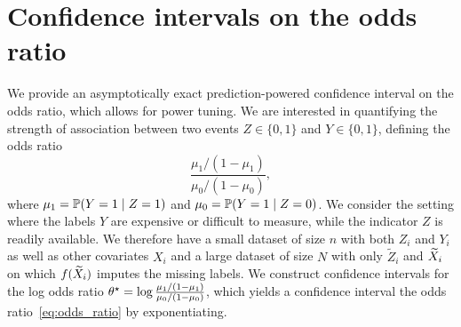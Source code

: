 \section{Confidence intervals on the odds ratio}
\label{app:odds-ratio}

\newcommand{\tZ}{\widetilde{Z}}
\newcommand{\diag}{\textup{diag}}

We provide an asymptotically exact prediction-powered confidence interval on
the odds ratio, which allows for power tuning. We are interested in
quantifying the strength of association between two events $Z\in\{0,1\}$ and
$Y\in\{0,1\}$, defining the odds ratio
\begin{equation}
  \label{eq:odds_ratio}
  \frac{\mu_1/(1-\mu_1)}{\mu_0/(1-\mu_0)},
\end{equation}
where $\mu_1 = \P(Y = 1 \mid Z=1)$ and $\mu_0 = \P(Y = 1 \mid Z=0)$.  We
consider the setting where the labels $Y$ are expensive or difficult to
measure, while the indicator $Z$ is readily available. We therefore have a
small dataset of size $n$ with both $Z_i$ and $Y_i$ as well as other
covariates $X_i$ and a large dataset of size $N$ with only $\tZ_i$ and
$\tX_i$ on which $f(\tX_i)$ imputes the missing labels.
%
We construct confidence intervals for the log odds ratio
$\theta\opt = \log\frac{\mu_1/(1-\mu_1)}{\mu_0/(1-\mu_0)}$, which yields
a confidence interval the odds
ratio~\eqref{eq:odds_ratio} by exponentiating.

